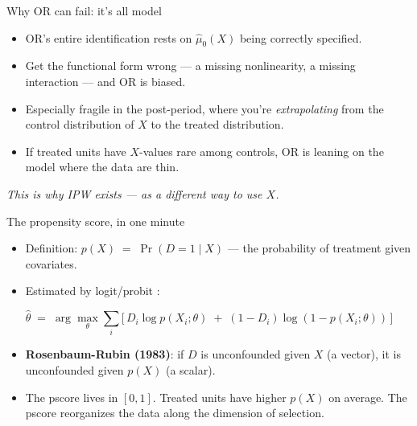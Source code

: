 \documentclass[aspectratio=169,11pt]{beamer}
\begin{document}
\begin{frame}{Why OR can fail: it's all model}
\vspace{0.4em}
\begin{itemize}
  \item OR's entire identification rests on $\widehat{\mu}_0(X)$ being correctly specified.
  \item Get the functional form wrong --- a missing nonlinearity, a missing interaction --- and OR is biased.
  \item Especially fragile in the post-period, where you're \textit{extrapolating} from the control distribution of $X$ to the treated distribution.
  \item If treated units have $X$-values rare among controls, OR is leaning on the model where the data are thin.
\end{itemize}
\vspace{0.5em}
\begin{center}
\small\color{warmgray}\itshape
This is why IPW exists --- as a different way to use $X$.
\end{center}
\end{frame}


\begin{frame}{The propensity score, in one minute}
\vspace{0.5em}
\begin{itemize}
  \item Definition: \;$p(X) \;=\; \Pr(D{=}1 \mid X)$ --- the probability of treatment given covariates.
  \item Estimated by logit/probit :
\end{itemize}
\vspace{-0.2em}
\[
\widehat{\theta} \;=\; \arg\max_\theta \sum_i \big[\, D_i \log p(X_i; \theta) \;+\; (1-D_i)\log(1 - p(X_i; \theta)) \,\big]
\]
\vspace{-0.2em}
\begin{itemize}\small
  \item \textbf{Rosenbaum-Rubin (1983)}: if $D$ is unconfounded given $X$ (a vector), it is unconfounded given $p(X)$ (a scalar). \\ 
  \item The pscore lives in $[0,1]$. Treated units have higher $p(X)$ on average. The pscore reorganizes the data along the dimension of selection.
\end{itemize}
\end{frame}
\end{document}
